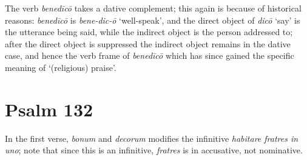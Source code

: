 \documentclass[a4paper, 12pt]{article}
\newcommand{\form}[1]{\emph{#1}}
\newcommand{\translate}[1]{`#1'}
\begin{document}
The verb \form{benedīcō} takes a dative complement;
this again is because of historical reasons:
\form{benedīcō} is \form{bene-dic-\={o}} \translate{well-speak},
and the direct object of \form{dic\={o}} \translate{say}
is the utterance being said, 
while the indirect object is the person addressed to; 
after the direct object is suppressed 
the indirect object remains in the dative case, 
and hence the verb frame of \form{benedīcō}
which has since gained the specific meaning of \translate{(religious) praise}.

\section{Psalm 132}

In the first verse, \form{bonum} and \form{decorum} modifies 
the infinitive \form{habitare fratres in uno}; 
note that since this is an infinitive, 
\form{fratres} is in accusative, not nominative.
\end{document}
